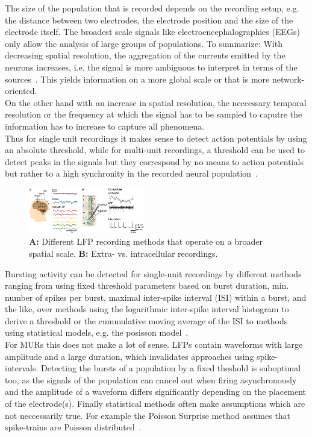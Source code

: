 \documentclass[11pt, twocolumn]{article}
\begin{document}
        The size of the population that is recorded depends on the recording setup, e.g. the distance between two electrodes, the electrode position and the size of the electrode itself. The broadest scale signals like electroencephalographies (EEGs) only allow the analysis of large groups of populations. To summarize: With decreasing spatial resolution, the aggregation of the currents emitted by the neurons increases, i.e. the signal is more ambiguous to interpret in terms of the sources~\autocite{einevoll2013modelling, herreras2016local}. This yields information on a more global scale or that is more network-oriented. \\
        On the other hand with an increase in spatial resolution, the neccessary temporal resolution or the frequency at which the signal has to be sampled to caputre the information has to increase to capture all phenomena. \\
        Thus for single unit recordings it makes sense to detect action potentials by using an absolute threshold, while for multi-unit recordings, a threshold can be used to detect peaks in the signals but they correspond by no means to action potentials but rather to a high synchronity in the recorded neural population~\autocite{herreras2016local}.
        \begin{figure}
         \begin{center}
            \includegraphics[keepaspectratio, width=0.45\textwidth]{img/2_lfp_scales.jpg}
         \end{center}
         \caption{\textbf{A:} Different LFP recording methods that operate on a broader spatial scale. \textbf{B:} Extra- vs. intracellular recordings.  ~\autocite{10.3389/fnins.2014.00423}}
        \end{figure}

        Bursting activity can be detected for single-unit recordings by different methods ranging from using fixed threshold parameters based on burst duration, min. number of spikes per burst, maximal inter-spike interval (ISI) within a burst, and the like, over methods using the logarithmic inter-spike interval histogram to derive a threshold or the cummulative moving average of the ISI to methods using statistical models, e.g. the posisson model~\autocite{cotterill2019burst}. \\
        For MURs this does not make a lot of sense. LFPs contain waveforms with large amplitude and a large duration, which invalidates approaches using spike-intervals. Detecting the bursts of a population by a fixed theshold is suboptimal too, as the signals of the population can cancel out when firing asynchronously and the amplitude of a waveform differs significantly depending on the placement of the electrode(s). Finally statistical methods often make assumptions which are not neccessarily true. For example the Poisson Surprise method assumes that spike-trains are Poisson distributed~\autocite{cotterill2019burst}.
\end{document}
